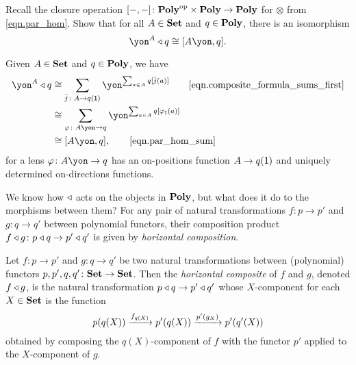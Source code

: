 \documentclass[Book-Poly]{subfiles}
\begin{document}
\begin{exercise}
Recall the closure operation $[-,-]\colon\mathbf{Poly}^{\textnormal{op}}\times\mathbf{Poly}\to\mathbf{Poly}$ for $\otimes$ from \eqref{eqn.par_hom}.
Show that for all $A\in\mathbf{Set}$ and $q\in\mathbf{Poly}$, there is an isomorphism
\[
    \yon^A\tri q\iso\ihom{A\yon,q}.
\]
\begin{solution}
Given $A\in\mathbf{Set}$ and $q\in\mathbf{Poly}$, we have
\begin{align*}
    \yon^A\tri q    &\iso
	\sum_{\bar{j}\colon A\to q(\1)}\yon^{\sum_{a\in A}q[\bar{j}(a)]}
	\tag*{\eqref{eqn.composite_formula_sums_first}} \\ &\iso
	\sum_{\varphi\colon A\yon\to q}\yon^{\sum_{a\in A}q[\varphi_\1(a)]}   \\&\iso
	\ihom{A\yon,q},
	\tag*{\eqref{eqn.par_hom_sum}}
\end{align*}
for a lens $\varphi\colon A\yon\to q$ has an on-positions function $A\to q(\textsf{1})$ and uniquely determined on-directions functions.
\end{solution}
\end{exercise}

We know how $\mathbin{\triangleleft}$ acts on the objects in $\mathbf{Poly}$, but what does it do to the morphisms between them?
For any pair of natural transformations $f\colon p\to p'$ and $g\colon q\to q'$ between polynomial functors, their composition product $f\mathbin{\triangleleft} g\colon p\mathbin{\triangleleft} q\to p'\mathbin{\triangleleft} q'$ is given by \emph{horizontal composition}.

\begin{definition}\label{def.horiz_comp_nat_trans}
Let $f\colon p\to p'$ and $g\colon q\to q'$ be two natural transformations between (polynomial) functors $p,p',q,q'\colon\mathbf{Set}\to\mathbf{Set}$.
Then the \emph{horizontal composite} of $f$ and $g$, denoted $f\mathbin{\triangleleft} g$, is the natural transformation $p\mathbin{\triangleleft} q\to p'\mathbin{\triangleleft} q'$ whose $X$-component for each $X\in\mathbf{Set}$ is the function
\begin{equation} \label{eqn.horiz_comp_nat_trans_comp}
    p(q(X)) \xrightarrow{f_{q(X)}} p'(q(X)) \xrightarrow{p'(g_X)} p'(q'(X))
\end{equation}
obtained by composing the $q(X)$-component of $f$ with the functor $p'$ applied to the $X$-component of $g$.
\end{definition}
\end{document}
